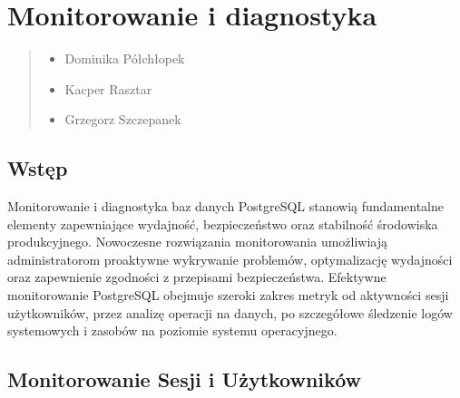 \documentclass[a4paper,11pt,openany,english]{sphinxmanual}
\begin{document}
\sphinxstepscope


\section{Monitorowanie i diagnostyka}
\label{\detokenize{rozdzial2/Monitorowanie-i-diagnostyka/index:monitorowanie-i-diagnostyka}}\label{\detokenize{rozdzial2/Monitorowanie-i-diagnostyka/index::doc}}\begin{quote}\begin{description}
\begin{itemize}
\item {} 
\sphinxAtStartPar
Dominika Półchłopek

\item {} 
\sphinxAtStartPar
Kacper Rasztar

\item {} 
\sphinxAtStartPar
Grzegorz Szczepanek

\end{itemize}

\end{description}\end{quote}


\subsection{Wstęp}
\label{\detokenize{rozdzial2/Monitorowanie-i-diagnostyka/index:wstep}}
\sphinxAtStartPar
Monitorowanie i diagnostyka baz danych PostgreSQL stanowią fundamentalne elementy zapewniające wydajność, bezpieczeństwo oraz stabilność środowiska produkcyjnego. Nowoczesne rozwiązania monitorowania umożliwiają administratorom proaktywne wykrywanie problemów, optymalizację wydajności oraz zapewnienie zgodności z przepisami bezpieczeństwa. Efektywne monitorowanie PostgreSQL obejmuje szeroki zakres metryk \sphinxhyphen{} od aktywności sesji użytkowników, przez analizę operacji na danych, po szczegółowe śledzenie logów systemowych i zasobów na poziomie systemu operacyjnego.


\subsection{Monitorowanie   Sesji   i       Użytkowników}
\label{\detokenize{rozdzial2/Monitorowanie-i-diagnostyka/index:monitorowanie-sesji-i-uzytkownikow}}
\end{document}

